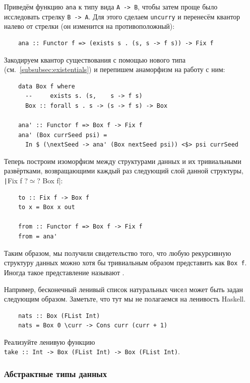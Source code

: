 Приведём функцию \texttt{ana} к типу вида \texttt{A -> B}, чтобы затем проще было исследовать стрелку \texttt{B -> A}.
Для этого сделаем \texttt{uncurry} и перенесём квантор налево от стрелки (он изменится на противоположный):
\begin{verbatim}
    ana :: Functor f => (exists s . (s, s -> f s)) -> Fix f
\end{verbatim}
Закодируем квантор существования с помощью нового типа (см.~\ref{subsubsec:existentials}) и перепишем анаморфизм на работу с ним:
\begin{verbatim}
    data Box f where
      --     exists s. (s,    s -> f s)
      Box :: forall s . s -> (s -> f s) -> Box

    ana' :: Functor f => Box f -> Fix f
    ana' (Box currSeed psi) =
      In $ (\nextSeed -> ana' (Box nextSeed psi)) <$> psi currSeed
\end{verbatim}
Теперь построим изоморфизм между структурами данных и их тривиальными развёртками, возвращающими каждый раз следующий слой данной структуры, \texttt|Fix f ?$\simeq$? Box f|:
\begin{verbatim}
    to :: Fix f -> Box f
    to x = Box x out

    from :: Functor f => Box f -> Fix f
    from = ana'
\end{verbatim}
Таким образом, мы получили свидетельство того, что любую рекурсивную структуру данных можно хотя бы тривиальным образом представить как \texttt{Box f}.
Иногда такое представление называют .

Например, бесконечный ленивый список натуральных чисел может быть задан следующим образом.
Заметьте, что тут мы не полагаемся на ленивость Haskell.
\begin{verbatim}
    nats :: Box (FList Int)
    nats = Box 0 \curr -> Cons curr (curr + 1)
\end{verbatim}

\begin{task}
    Реализуйте ленивую функцию \\ \texttt{take :: Int -> Box (FList Int) -> Box (FList Int)}.
\end{task}

\subsubsection{Абстрактные типы данных} \label{subsubsec:abstract-data-types}


